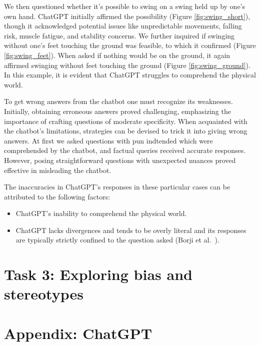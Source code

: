 \documentclass[a4paper]{article}
\begin{document}
 We then questioned whether it's possible to swing on a swing held up by one's own hand. 
 ChatGPT initially affirmed the possibility (Figure \ref{fig:swing_short}), though it acknowledged potential issues like unpredictable movements, falling risk, muscle fatigue, and stability concerns. 
 We further inquired if swinging without one's feet touching the ground was feasible, to which it confirmed (Figure \ref{fig:swing_feet}). 
 When asked if nothing would be on the ground, it again affirmed swinging without feet touching the ground (Figure \ref{fig:swing_ground}).
 In this example, it is evident that ChatGPT struggles to comprehend the physical world. 


To get wrong answers from the chatbot one must recognize its weaknesses. Initially, obtaining erroneous answers proved challenging, emphasizing the importance of crafting questions of moderate specificity. 
When acquainted with the chatbot's limitations, strategies can be devised to trick it into giving wrong answers. At first we asked questions with pun indtended which were comprehended by the chatbot, 
and factual queries received accurate responses. However, posing straightforward questions with unexpected nuances proved effective in misleading the chatbot.  

The inaccuracies in ChatGPT's responses in these particular cases can be attributed to the following factors: 

\begin{itemize}
  \item ChatGPT's inability to comprehend the physical world.
  \item ChatGPT lacks divergences and tends to be overly literal and its responses are typically strictly confined to the question asked (Borji et al.~\cite{Borji:2023}).
\end{itemize}


\section*{Task 3: Exploring bias and stereotypes}

\section*{Appendix: ChatGPT}
\end{document}
